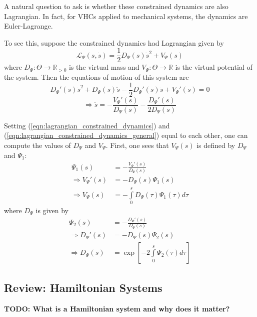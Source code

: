A natural question to ask is whether these constrained dynamics are also
Lagrangian. In fact, for VHCs applied to mechanical systems, the dynamics are
Euler-Lagrange. \cite{lagrangian_structure_reduced_dynamics_vhcs}

To see this, suppose the constrained dynamics had Lagrangian given by
\begin{equation*}
   \mathcal{L}_{\Psi}(s,\dot{s}) = \frac{1}{2}
   D_{\Psi}(s)\dot{s}^2 + V_{\Psi}(s)
\end{equation*}
where \(D_{\Psi} : \Theta \rightarrow \mathbb{R}_{>0}\) is the virtual mass
and \(V_{\Psi} : \Theta \rightarrow \mathbb{R}\) is the virtual potential of the
system. Then the equations of motion of this system are
\begin{equation*}
   D_{\Psi}'(s)\dot{s}^2 + D_{\Psi}(s)\ddot{s} - \frac{1}{2}D_{\Psi}'(s)\dot{s}
   + V_{\Psi}'(s) = 0
\end{equation*}
\begin{equation}\label{eqn:lagrangian_constrained_dynamics_general}
   \Rightarrow \ddot{s} = -\frac{V_{\Psi}'(s)}{D_{\Psi}(s)} -
   \frac{D_{\Psi}'(s)}{2 D_{\Psi}(s)}
\end{equation}

Setting (\ref{eqn:lagrangian_constrained_dynamics}) and
(\ref{eqn:lagrangian_constrained_dynamics_general}) equal to each other, one
can compute the values of \(D_{\Psi}\) and \(V_{\Psi}\). First, one sees that
\(V_{\Psi}(s)\) is defined by \(D_{\Psi}\) and \(\Psi_1\):
\begin{align*}
   \Psi_1(s) &= -\frac{V_{\Psi}'(s)}{D_{\Psi}(s)} \\
   \Rightarrow V_{\Psi}'(s) &= -D_{\Psi}(s) \Psi_1(s) \\
   \Rightarrow V_{\Psi}(s) &= - \int \limits_{0}^s
   D_{\Psi}(\tau)\Psi_1(\tau)d\tau
\end{align*}
where \(D_{\Psi}\) is given by
\begin{align*}
   \Psi_2(s) &= -\frac{D_{\Psi}'(s)}{D_\Psi(s)} \\
   \Rightarrow D_{\Psi}'(s) &= -D_{\Psi}(s) \Psi_2(s) \\
   \Rightarrow D_{\Psi}(s) &= \exp\left[ 
   -2\int \limits_{0}^s \Psi_2(\tau) d\tau \right]
\end{align*}

\subsection{Review: Hamiltonian Systems}
\textbf{TODO: What is a Hamiltonian system and why does it matter?}

